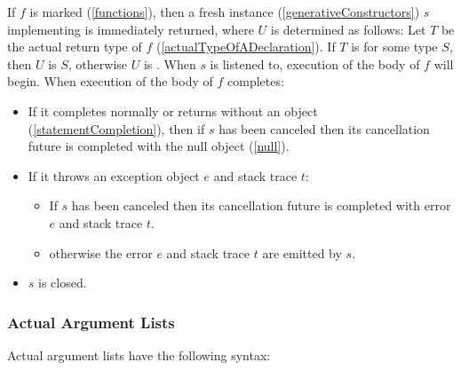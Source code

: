 \documentclass[makeidx]{article}
\begin{document}
{\LMHash{}%
If $f$ is marked \code{\ASYNC*} (\ref{functions}),
then a fresh instance (\ref{generativeConstructors}) $s$
implementing  is immediately returned,
where $U$ is determined as follows:
Let $T$ be the actual return type of $f$ (\ref{actualTypeOfADeclaration}).
If $T$ is  for some type $S$, then $U$ is $S$,
otherwise $U$ is .
When $s$ is listened to, execution of the body of $f$ will begin.
When execution of the body of $f$ completes:
\begin{itemize}
\item If it completes normally or returns without an object
  (\ref{statementCompletion}),
  then if $s$ has been canceled
  then its cancellation future is completed with the null object (\ref{null}).
\item If it throws an exception object $e$ and stack trace $t$:
  \begin{itemize}
  \item If $s$ has been canceled then its cancellation future is completed with error $e$ and stack trace $t$.
  \item otherwise the error $e$ and stack trace $t$ are emitted by $s$.
  \end{itemize}
\item $s$ is closed.
\end{itemize}




\subsubsection{Actual Argument Lists}

\LMHash{}%
Actual argument lists have the following syntax:

}
\end{document}
